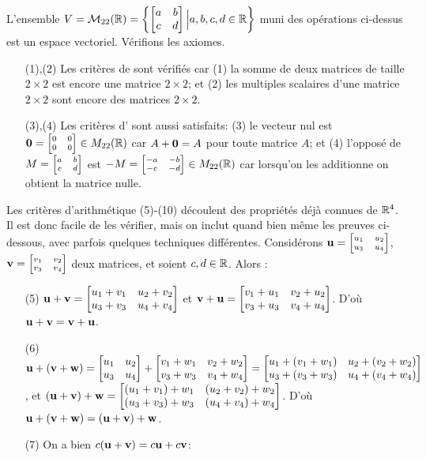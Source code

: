 \begin{myexample}  L'ensemble $\displaystyle V = \mathcal M_{22}(\mathbb{R}) = \left\{ \left[ \begin{matrix} a & b \\ c & d \end{matrix} \right] \Big| a,b,c,d \in \mathbb{R} \right\}$ muni des opérations ci-dessus est un espace vectoriel.
Vérifions les axiomes.
\begin{itemize}
	\item[(1),(2)]Les critères de  sont vérifiés car (1) la somme de deux matrices de taille $2\times 2$  est encore une matrice
$2\times 2$; et (2) les multiples scalaires d'une matrice $2\times 2$ sont encore des matrices  $2\times 2$.
	\item[(3),(4)]Les critères d' sont aussi satisfaits: (3) le vecteur nul est $\mathbf{0} = {\scriptsize\left[ \begin{matrix} 0&0 \\ 0& 0 \end{matrix} \right]} \in M_{2 2}(\mathbb{R})$ car $A+\mathbf{0}=A$ pour toute matrice $A$; 
et (4) l'oppos\'e de $M={\scriptsize\left[ \begin{matrix} a&b\\c&d \end{matrix} \right]}$ est $-M={\scriptsize\left[ \begin{matrix} -a&-b\\-c&-d \end{matrix} \right]} \in M_{22}(\mathbb{R})$ car lorsqu'on les additionne on obtient la matrice nulle.
\end{itemize}
Les critères d'arithmétique (5)-(10) découlent des propriétés déjà connues de
 $\mathbb{R}^4$. Il est donc facile de les vérifier, mais on inclut quand bien même les
preuves ci-dessous, avec parfois quelques techniques différentes.  
Considérons $\mathbf{u} = {\scriptsize\left[ \begin{matrix} u_1 & u_2\\ u_3 & u_4 \end{matrix} \right]}$, $\mathbf{v} = {\scriptsize\left[ \begin{matrix} v_1&v_2\\ v_3&v_4 \end{matrix} \right]}$ deux matrices, et soient $c,d\in \mathbb{R}$.  Alors :
\begin{itemize}
\item[(5)] $\mathbf{u} + \mathbf{v} = \left[ \begin{matrix} u_1+v_1 & u_2+v_2\\ u_3+v_3 & u_4+v_4 \end{matrix} \right]$ et
$\mathbf{v} + \mathbf{u} = \left[ \begin{matrix} v_1+u_1 & v_2+u_2\\ v_3+u_3 & v_4+u_4 \end{matrix} \right]$. D'où $\mathbf{u} + \mathbf{v} = \mathbf{v} + \mathbf{u}$.
\item[(6)]  $\mathbf{u} + (\mathbf{v} + \mathbf{w}) = \left[ \begin{matrix} u_1 & u_2 \\ u_3 & u_4 \end{matrix} \right]+ \left[ \begin{matrix} v_1+w_1 & v_2+w_2\\ v_3+w_3 & v_4+w_4 \end{matrix} \right] = \left[ \begin{matrix}  u_1 + (v_1+w_1) & u_2+(v_2+w_2) \\ u_3 + (v_3+w_3) & u_4+(v_4+w_4) \end{matrix} \right]$, et 
$(\mathbf{u} + \mathbf{v}) + \mathbf{w} =  \left[ \begin{matrix}  (u_1 + v_1)+w_1 & (u_2+v_2)+w_2 \\ (u_3 + v_3)+w_3 & (u_4+v_4)+w_4 \end{matrix} \right]$. D'où $\mathbf{u} + (\mathbf{v} + \mathbf{w}) = (\mathbf{u} + \mathbf{v}) + \mathbf{w}$.
\item[(7)] On a bien $c(\mathbf{u} + \mathbf{v}) = c\mathbf{u} + c\mathbf{v}$:

\end{itemize}
\end{myexample}
